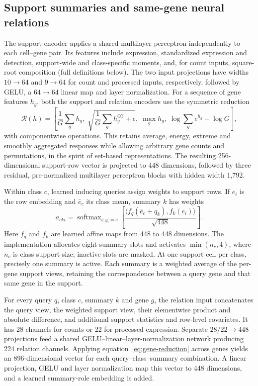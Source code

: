 \subsection*{Support summaries and same-gene neural relations}
\label{methods:cellpfn-backbone}
The support encoder applies a shared multilayer perceptron independently to each cell--gene pair. Its features include expression, standardized expression and detection, support-wide and class-specific moments, and, for count inputs, square-root composition (full definitions below). The two input projections have widths $10\rightarrow64$ and $9\rightarrow64$ for count and processed inputs, respectively, followed by GELU, a $64\rightarrow64$ linear map and layer normalization. For a sequence of gene features $h_g$, both the support and relation encoders use the symmetric reduction
\begin{equation}
 \mathcal R(h)=\left[\frac1G\sum_g h_g,\;
 \sqrt{\frac1G\sum_g h_g^{\odot2}+\epsilon},\;
 \max_g h_g,\;\log\sum_g e^{h_g}-\log G\right],
 \label{eq:gene-reduction}
\end{equation}
with componentwise operations. This retains average, energy, extreme and smoothly aggregated responses while allowing arbitrary gene counts and permutations, in the spirit of set-based representations\citep{zaheer2017deepsets}. The resulting 256-dimensional support-row vector is projected to 448 dimensions, followed by three residual, pre-normalized multilayer perceptron blocks with hidden width 1,792.

Within class $c$, learned inducing queries assign weights to support rows. If $e_i$ is the row embedding and $\bar e_c$ its class mean, summary $k$ has weights
\begin{equation}
 a_{cki}=\operatorname{softmax}_{i:y_i=c}
 \left[\frac{\langle f_q(\bar e_c+q_k),f_k(e_i)\rangle}{\sqrt{448}}\right].
 \label{eq:class-summary}
\end{equation}
Here $f_q$ and $f_k$ are learned affine maps from 448 to 448 dimensions. The implementation allocates eight summary slots and activates $\min(n_c,4)$, where $n_c$ is class support size; inactive slots are masked. At one support cell per class, precisely one summary is active. Each summary is a weighted average of the per-gene support views, retaining the correspondence between a query gene and that same gene in the support.

For every query $q$, class $c$, summary $k$ and gene $g$, the relation input concatenates the query view, the weighted support view, their elementwise product and absolute difference, and additional support statistics and row-level covariates. It has 28 channels for counts or 22 for processed expression. Separate $28/22\rightarrow448$ projections feed a shared GELU--linear--layer-normalization network producing 224 relation channels. Applying equation~\ref{eq:gene-reduction} across genes yields an 896-dimensional vector for each query--class--summary combination. A linear projection, GELU and layer normalization map this vector to 448 dimensions, and a learned summary-role embedding is added.

